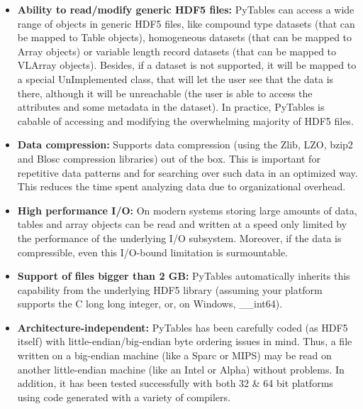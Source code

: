 \begin{itemize}
\item \textbf{Ability to read/modify generic HDF5
  files:} PyTables can access a wide range of objects in
  generic HDF5 files, like compound type datasets (that can be
  mapped to Table objects), homogeneous datasets
  (that can be mapped to Array objects) or
  variable length record datasets (that can be mapped to
  VLArray objects). Besides, if a dataset is not
  supported, it will be mapped to a special
  UnImplemented class,
  that will let the user see that the data is there, although it
  will be unreachable (the user is able to access the
  attributes and some metadata in the dataset). In practice, PyTables
  is cabable of accessing and modifying the overwhelming majority of
  HDF5 files.

\item \textbf{Data compression:} Supports data
  compression (using the Zlib, LZO, bzip2
  and Blosc compression libraries) out of the
  box. This is important for repetitive data patterns and
  for searching over such data in an optimized way. This 
  reduces the time spent analyzing data due to organizational 
    overhead.

\item \textbf{High performance I/O:} On modern systems
  storing large amounts of data, tables and array objects can be
  read and written at a speed only limited by the performance of the
  underlying I/O subsystem. Moreover, if the data is compressible,
  even this I/O-bound limitation is surmountable.

\item \textbf{Support of files bigger than 2 GB:}
  PyTables automatically inherits this capability from the
  underlying HDF5 library (assuming your platform supports the C
  long long integer, or, on Windows, \_\_int64).

\item \textbf{Architecture-independent:} PyTables has
  been carefully coded (as HDF5 itself) with
  little-endian/big-endian byte ordering issues in mind. Thus, a
  file written on a big-endian machine (like a Sparc or MIPS) may be
  read on another little-endian machine (like an Intel or Alpha)
  without problems. In addition, it has been tested successfully
  with both 32 \& 64 bit platforms using code generated with a variety 
  of compilers.

\end{itemize}

